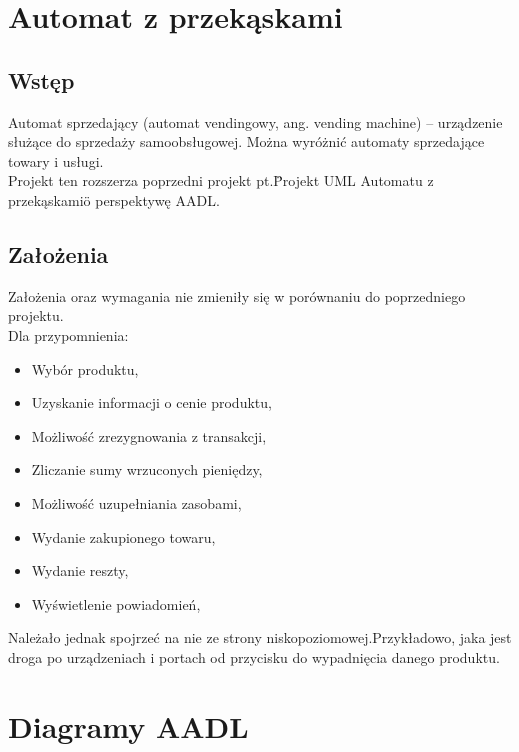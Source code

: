 \documentclass[a4paper, 11pt]{article}
\begin{document}
\section{Automat z przekąskami }

\subsection{Wstęp}
 Automat sprzedający (automat vendingowy, ang. vending machine) – urządzenie służące do sprzedaży samoobsługowej. Można wyróżnić automaty sprzedające towary i usługi.\\
Projekt ten rozszerza poprzedni projekt pt.\"Projekt UML Automatu z przekąskami\" o perspektywę AADL.\\

\subsection{Założenia}
Założenia oraz wymagania nie zmieniły się w porównaniu do poprzedniego projektu.\\
Dla przypomnienia:
\begin{itemize}
\item Wybór produktu,
\item Uzyskanie informacji o cenie produktu,
\item Możliwość zrezygnowania z transakcji,
\item Zliczanie sumy wrzuconych pieniędzy,
\item Możliwość uzupełniania zasobami,
\item Wydanie zakupionego towaru,
\item Wydanie reszty,
\item Wyświetlenie powiadomień,
\end{itemize}

Należało jednak spojrzeć na nie ze strony niskopoziomowej.Przykładowo, jaka jest droga po urządzeniach i portach od przycisku do wypadnięcia danego produktu.\\


\section{Diagramy AADL}
\end{document}
